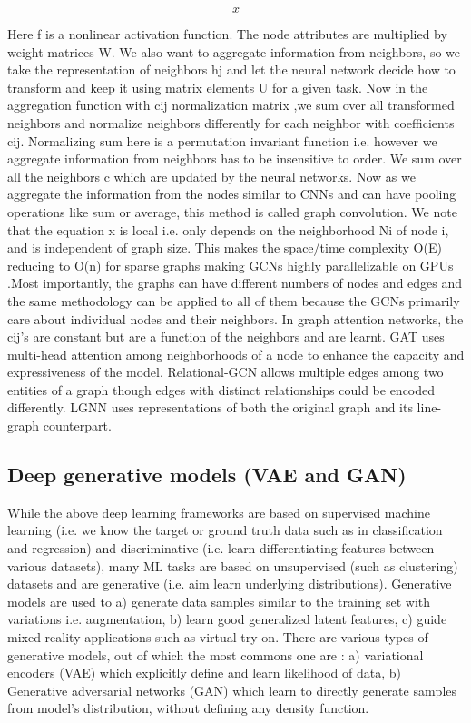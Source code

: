 \documentclass[pdflatex,sn-mathphys]{sn-jnl}%
\theoremstyle{thmstyleone}%
\theoremstyle{thmstyletwo}%
\theoremstyle{thmstylethree}%
\begin{document}
\begin{equation}\label{eq:gcn-update}
x
\end{equation}


Here f is a nonlinear activation function. The node attributes are multiplied by weight matrices W. We also want to aggregate information from neighbors, so we take the representation of neighbors hj and let the neural network decide how to transform and keep it using matrix elements U for a given task. Now in the aggregation function with cij normalization matrix ,we sum over all transformed neighbors and normalize neighbors differently for each neighbor with coefficients cij. Normalizing sum here is a permutation invariant function i.e. however we aggregate information from neighbors has to be insensitive to order. We sum over all the neighbors c which are updated by the neural networks. Now as we aggregate the information from the nodes similar to CNNs and can have pooling operations like sum or average, this method is called graph convolution. We note that the equation x is local i.e. only depends on the neighborhood Ni of node i, and is independent of graph size. This  makes the space/time complexity O(E) reducing to O(n) for sparse graphs making GCNs highly parallelizable on GPUs .Most importantly, the graphs can have different numbers of nodes and edges and the same methodology can be applied to all of them because the GCNs primarily care about individual nodes and their neighbors. 
In graph attention networks, the cij's are constant but are a function of the neighbors and are learnt. GAT uses multi-head attention among neighborhoods of a node to enhance the capacity and expressiveness of the model.  Relational-GCN allows multiple edges among two entities of a graph though edges with distinct relationships could be encoded differently. LGNN uses representations of both the original graph and its line-graph counterpart. 
\subsection{Deep generative models (VAE and GAN)}\label{sec:generative}

While the above deep learning frameworks are based on supervised machine learning (i.e. we know the target or ground truth data such as in classification and regression) and discriminative (i.e. learn differentiating features between various datasets), many ML tasks are based on unsupervised (such as clustering) datasets and are generative (i.e. aim learn underlying distributions). Generative models are used to a) generate data samples similar to the training set with variations i.e. augmentation, b) learn good generalized latent features, c) guide mixed reality applications such as virtual try-on. There are various types of generative models, out of which the most commons one are : a) variational encoders (VAE) which explicitly define and learn likelihood of data, b) Generative adversarial networks (GAN) which learn to directly generate samples from model's distribution, without defining any density function.
\end{document}

